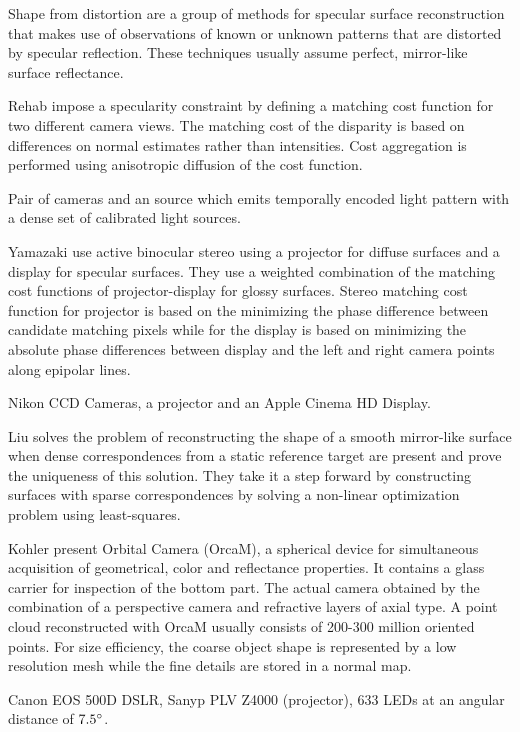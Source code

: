Shape from distortion are a group of methods for specular surface reconstruction that makes use of observations of known or unknown patterns that are distorted by specular reflection. These techniques usually assume perfect, mirror-like surface reflectance.

\dagg Rehab \etal impose a specularity constraint by defining a matching cost function for two different camera views. The matching cost of the disparity is based on differences on normal estimates rather than intensities. Cost aggregation is performed using anisotropic diffusion of the cost function.

\hardware Pair of cameras and an source which emits temporally encoded light pattern with a dense set of calibrated light sources. 

\dagg Yamazaki \etal \cite{yamazaki20103d} use active binocular stereo using a projector for diffuse surfaces and a display for specular surfaces. They use a weighted combination of the matching cost functions of projector-display for glossy surfaces. Stereo matching cost function for projector is based on the minimizing the phase difference between candidate matching pixels while for the display is based on minimizing the absolute phase differences between display and the left and right camera points along epipolar lines. 

 Nikon CCD Cameras, a projector and an Apple Cinema HD Display.

\dagg Liu \etal \cite{liu2013mirror} solves the problem of reconstructing the shape of a smooth mirror-like surface when dense correspondences from a static reference target are present and prove the uniqueness of this solution. They take it a step forward by constructing surfaces with sparse correspondences by solving a non-linear optimization problem using least-squares. 

\dagg Kohler \etal \cite{kohler2013full} present Orbital Camera (OrcaM), a spherical device for simultaneous acquisition of geometrical, color and reflectance properties. It contains a glass carrier for inspection of the bottom part.  The actual camera obtained by the combination of a perspective camera and refractive layers of axial type. A point cloud reconstructed with OrcaM usually consists of 200-300 million oriented points. For size efficiency, the coarse object shape is represented by a low resolution mesh while the fine details are stored in a normal map.

 Canon EOS 500D DSLR, Sanyp PLV Z4000 (projector), 633 LEDs at an angular distance of $7.5 \degree$.

